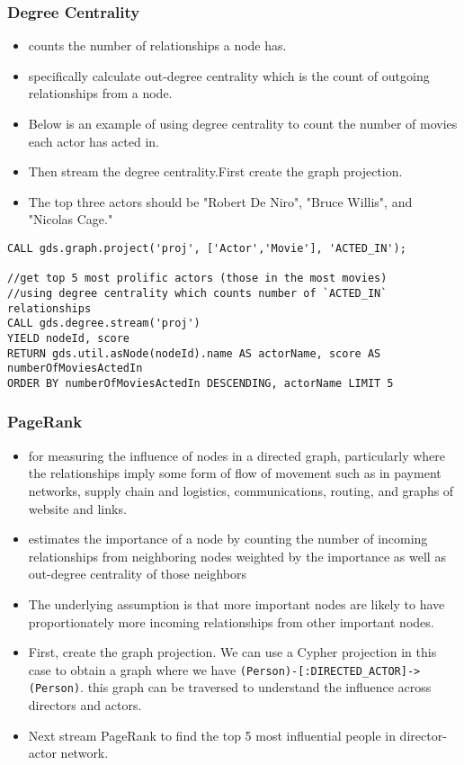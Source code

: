 \begin{frame}[fragile]\frametitle{Degree Centrality}


\begin{itemize}
\item counts the number of relationships a node has.
\item specifically calculate out-degree centrality which is the count of outgoing relationships from a node.
\item Below is an example of using degree centrality to count the number of movies each actor has acted in. 
\item Then stream the degree centrality.First create the graph projection.
\item The top three actors should be "Robert De Niro", "Bruce Willis", and "Nicolas Cage."
\end{itemize}

\begin{lstlisting}
CALL gds.graph.project('proj', ['Actor','Movie'], 'ACTED_IN');

//get top 5 most prolific actors (those in the most movies)
//using degree centrality which counts number of `ACTED_IN` relationships
CALL gds.degree.stream('proj')
YIELD nodeId, score
RETURN gds.util.asNode(nodeId).name AS actorName, score AS numberOfMoviesActedIn
ORDER BY numberOfMoviesActedIn DESCENDING, actorName LIMIT 5
\end{lstlisting}

\end{frame}

\begin{frame}[fragile]\frametitle{PageRank}


\begin{itemize}
\item  for measuring the influence of nodes in a directed graph, particularly where the relationships imply some form of flow of movement such as in payment networks, supply chain and logistics, communications, routing, and graphs of website and links.
\item estimates the importance of a node by counting the number of incoming relationships from neighboring nodes weighted by the importance as well as out-degree centrality of those neighbors
\item The underlying assumption is that more important nodes are likely to have proportionately more incoming relationships from other important nodes.
\item First, create the graph projection. We can use a Cypher projection in this case to obtain a graph where we have \lstinline|(Person)-[:DIRECTED_ACTOR]->(Person)|. this graph can be traversed to understand the influence across directors and actors.
\item Next stream PageRank to find the top 5 most influential people in director-actor network.
\end{itemize}


\end{frame}

